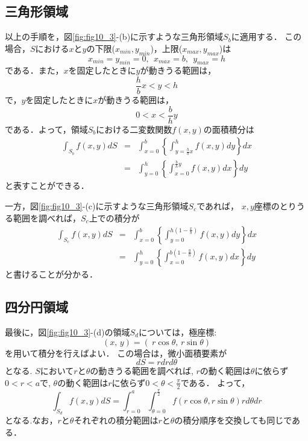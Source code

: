 ﻿\documentclass[10pt,a4j]{jbook}
\begin{document}
\subsection{三角形領域}
以上の手順を，図\ref{fig:fig10_3}-(b)に示すような三角形領域$S_b$に適用する．
この場合，$S$における$x$と$y$の下限($x_{min},y_{min}$)，上限($x_{max},y_{max}$)は
\begin{equation}
	x_{min}=y_{min}=0, \ \ x_{max}=b, \ \ y_{max}=h
\end{equation}
である．また，$x$を固定したときに$y$が動きうる範囲は，
\begin{equation}
	\frac{h}{b}x < y < h
	\label{eqn:ybnd_Sb}
\end{equation}
で，$y$を固定したときに$x$が動きうる範囲は，
\begin{equation}
	0 < x < \frac{b}{h}y
	\label{eqn:xbnd_Sb}
\end{equation}
である．よって，領域$S_b$における二変数関数$f(x,y)$の面積積分は
\begin{eqnarray}
	\int_{S_b} f(x,y) dS
	&=&
	\int_{x=0}^b \left\{ \int_{y=\frac{h}{b}x}^h f(x,y)dy\right\} dx 
	\label{eqn:int_Sb_yx}
	\\
	&=&
	\int_{y=0}^h \left\{ \int_{x=0}^{\frac{b}{h}y} f(x,y)dx\right\}dy
	\label{eqn:int_Sb_xy}
\end{eqnarray}
と表すことができる．

一方，図\ref{fig:fig10_3}-(c)に示すような三角形領域$S_c$であれば，
$x,y$座標のとりうる範囲を調べれば，$S_c$上での積分が
\begin{eqnarray}
	\int_{S_c} f(x,y) dS
	&=&
	\int_{x=0}^b \left\{ \int_{y=0}^{h\left(1-\frac{x}{b}\right)} f(x,y)dy\right\}dx 
	\label{eqn:int_Sc_yx}
	\\
	&=&
	\int_{y=0}^h \left\{ \int_{x=0}^{b\left(1-\frac{y}{h}\right)} f(x,y)dx\right\} dy
	\label{eqn:int_Sc_xy}
\end{eqnarray}
と書けることが分かる．

\subsection{四分円領域}
最後に，図\ref{fig:fig10_3}-(d)の領域$S_d$については，極座標:
\begin{equation}
	\left(x,\,y\right) = \left(\ r\cos\theta,\, r\sin\theta \right)
	\label{eqn:cart2pol}
\end{equation}
を用いて積分を行えばよい．
この場合は，微小面積要素が
\begin{equation}
	dS=r dr d\theta
	\label{eqn:dS_rth}
\end{equation}
となる.
$S$において$r$と$\theta$の動きうる範囲を調べれば,
$r$の動く範囲は$\theta$に依らず$0<r<a$で,
$\theta$の動く範囲は$r$に依らず$0<\theta<\frac{\pi}{2}$である．
よって，
\begin{equation}
	\int_{S_d} f(x,y) dS
	=
	\int_{r=0}^a \int_{\theta=0}^{\frac{\pi}{2}} 
	f(r\cos\theta,r\sin\theta)rd\theta dr
	\label{eqn:int_pol}
\end{equation}
となる.なお，$r$と$\theta$それぞれの積分範囲は$r$と$\theta$の積分順序を交換しても同じである．
\end{document}
